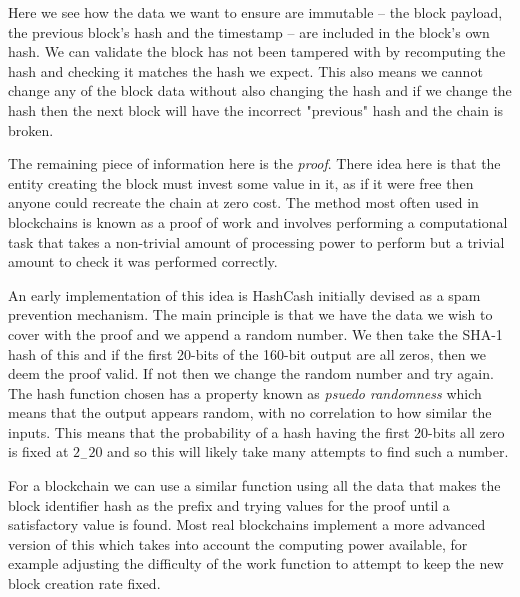 Here we see how the data we want to ensure are immutable -- the block payload, the previous block's hash and the timestamp -- are included in the block's own hash.  We can validate the block has not been tampered with by recomputing the hash and checking it matches the hash we expect. This also means we cannot change any of the block data without also changing the hash and if we change the hash then the next block will have the incorrect "previous" hash and the chain is broken.

The remaining piece of information here is the \emph{proof}. There idea here is that the entity creating the block must invest some value in it, as if it were free then anyone could recreate the chain at zero cost. The method most often used in blockchains is known as a proof of work and involves performing a computational task that takes a non-trivial amount of processing power to perform but a trivial amount to check it was performed correctly.

An early implementation of this idea is HashCash  initially devised as a spam prevention mechanism. The main principle is that we have the data we wish to cover with the proof and we append a random number. We then take the SHA-1 hash of this and if the first 20-bits of the 160-bit output are all zeros, then we deem the proof valid. If not then we change the random number and try again. The hash function chosen has a property known as \emph{psuedo randomness} which means that the output appears random, with no correlation to how similar the inputs. This means that the probability of a hash having the first 20-bits all zero is fixed at $2_-20$ and so this will likely take many attempts to find such a number.

For a blockchain we can use a similar function using all the data that makes the block identifier hash as the prefix and trying values for the proof until a satisfactory value is found. Most real blockchains implement a more advanced version of this which takes into account the computing power available, for example adjusting the difficulty of the work function to attempt to keep the new block creation rate fixed.


